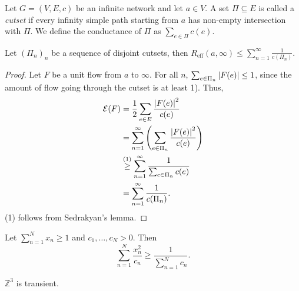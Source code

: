 \begin{defn}[Cutset]
  Let \(G=(V,E,c) \) be an infinite network and let \(a \in  V\). A set \(\Pi \subseteq E\) is called a \emph{cutset} if every infinity simple path starting from \(a\) has non-empty intersection with \(\Pi\). We define the conductance of \(\Pi\) as \(\sum_{e \in \Pi}c(e)\).
\end{defn}


\begin{thm}
    Let \((\Pi_n)_n\) be a sequence of disjoint cutsets, then \(R_{\mathrm{eff}}(a,\infty) \leq \sum_{n=1}^{\infty} \frac{1}{c(\Pi_n)}\).
\end{thm}

\begin{proof}
    Let \(F\) be a unit flow from \(a\) to \(\infty \). For all \(n\), \(\sum_{e \in \Pi_n} \abs{F(e)}  \leq 1\), since the amount of flow going through the cutset is at least 1). Thus,
    \begin{align*}
      \mathcal{E}(F) &= \frac{1}{2} \sum_{e \in E}^{} \frac{\abs{F(e)} ^2}{c(e)} \\
                     &= \sum_{n=1}^{\infty} \left(\sum_{e \in \Pi_n}^{} \frac{\abs{F(e)} ^2}{c(e)}\right) \\
                     &\overset{(1)}{\geq} \sum_{n=1}^{\infty} \frac{1}{\sum_{e \in \Pi_n }^{} c(e)} \\
                     &= \sum_{n=1}^{\infty}  \frac{1}{c(\Pi_n)}.
    \end{align*}
(1) follows from Sedrakyan's lemma.  
\end{proof}

\begin{lem}
    Let \(\sum_{n=1}^{N} x_n \geq 1\) and \(c_1, \dots, c_N >0\). Then
    \[\sum_{n=1}^{N} \frac{x_n^2}{c_n} \geq \frac{1}{\sum_{n=1}^{N} c_n}.\]
\end{lem}


\begin{thm}[]
    \(\mathbb{Z}^3\) is transient.
\end{thm}

